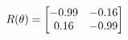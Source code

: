 \documentclass[preview]{standalone}
\begin{document}
\begin{align*}
\special{dvisvgm:raw <g id='unique000'>}R(\theta) = \begin{bmatrix}-0.99 & -0.16\\0.16 & -0.99\end{bmatrix}\special{dvisvgm:raw </g>}
\end{align*}
\end{document}
